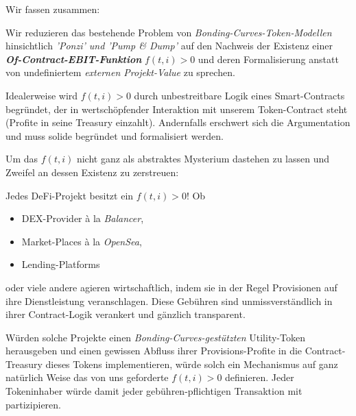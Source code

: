Wir fassen zusammen:

\vspace{0.2cm}

\begin{Fazit}

Wir reduzieren das bestehende Problem von \textit{Bonding-Curves-Token-Modellen} hinsichtlich \textit{'Ponzi' und 'Pump \& Dump'} auf den Nachweis der Existenz einer \textbf{\textit{Of-Contract-EBIT-Funktion}} $f(t, i) > 0$ und deren Formalisierung anstatt von undefiniertem \textit{externen Projekt-Value} zu sprechen.

\vspace{0.2cm}

Idealerweise wird $f(t, i) > 0$ durch unbestreitbare Logik eines Smart-Contracts begründet, der in wertschöpfender Interaktion mit unserem Token-Contract steht (Profite in seine Treasury einzahlt). Andernfalls erschwert sich die Argumentation und muss solide begründet und formalisiert werden.

\end{Fazit}

\vspace{0.3cm}

Um das $f(t, i)$ nicht ganz als abstraktes Mysterium dastehen zu lassen und Zweifel an dessen Existenz zu zerstreuen: 

\vspace{0.2cm}

\begin{Example}

Jedes DeFi-Projekt besitzt ein $f(t, i) > 0$! Ob

\begin{itemize}
  \item DEX-Provider à la \textit{Balancer}, 
  \item Market-Places à la \textit{OpenSea},
  \item Lending-Platforms
\end{itemize}  

oder viele andere agieren wirtschaftlich, indem sie in der Regel Provisionen auf ihre Dienstleistung veranschlagen. Diese Gebühren sind unmissverständlich in ihrer Contract-Logik verankert und gänzlich transparent. 

Würden solche Projekte einen \textit{Bonding-Curves-gestützten} Utility-Token herausgeben und einen gewissen Abfluss ihrer Provisions-Profite in die Contract-Treasury dieses Tokens implementieren, würde solch ein Mechanismus auf ganz natürlich Weise das von uns geforderte $f(t, i) > 0$ definieren. Jeder Tokeninhaber würde damit jeder gebühren-pflichtigen Transaktion mit partizipieren.

\end{Example}

